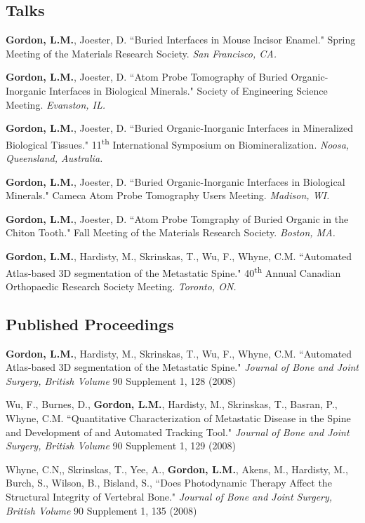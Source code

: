 \subsection*{Talks}
\textbf{Gordon, L.M.}, Joester, D. ``Buried Interfaces in Mouse Incisor Enamel." Spring Meeting of the Materials Research Society. \emph{San Francisco, CA.}

\begingroup\setlength{\parskip}{0.15cm}
\textbf{Gordon, L.M.}, Joester, D. ``Atom Probe Tomography of Buried Organic-Inorganic Interfaces in Biological Minerals." Society of Engineering Science Meeting. \emph{Evanston, IL.}

\textbf{Gordon, L.M.}, Joester, D. ``Buried Organic-Inorganic Interfaces in Mineralized Biological Tissues." 11\textsuperscript{th} International Symposium on Biomineralization. \emph{Noosa, Queensland, Australia.}

\textbf{Gordon, L.M.}, Joester, D. ``Buried Organic-Inorganic Interfaces in Biological Minerals." Cameca Atom Probe Tomography Users Meeting. \emph{Madison, WI.}

\textbf{Gordon, L.M.}, Joester, D. ``Atom Probe Tomgraphy of Buried Organic in the Chiton Tooth." Fall Meeting of the Materials Research Society. \emph{Boston, MA.}

\textbf{Gordon, L.M.}, Hardisty, M., Skrinskas, T., Wu, F., Whyne, C.M. ``Automated Atlas-based 3D segmentation of the Metastatic Spine." 40\textsuperscript{th} Annual Canadian Orthopaedic Research Society Meeting. \emph{Toronto, ON.}
\endgroup

\subsection*{Published Proceedings}
\textbf{Gordon, L.M.}, Hardisty, M., Skrinskas, T., Wu, F., Whyne, C.M. ``Automated Atlas-based 3D segmentation of the Metastatic Spine." \emph{Journal of Bone and Joint Surgery, British Volume} 90 Supplement 1, 128 (2008)

\begingroup\setlength{\parskip}{0.15cm}
Wu, F., Burnes, D., \textbf{Gordon, L.M.}, Hardisty, M., Skrinskas, T., Basran, P., Whyne, C.M. ``Quantitative Characterization of Metastatic Disease in the Spine and Development of and Automated Tracking Tool."  \emph{Journal of Bone and Joint Surgery, British Volume} 90 Supplement 1, 129 (2008)

Whyne, C.N,, Skrinskas, T., Yee, A., \textbf{Gordon, L.M.}, Akens, M., Hardisty, M., Burch, S., Wilson, B., Bisland, S., ``Does Photodynamic Therapy Affect the Structural Integrity of Vertebral Bone." \emph{Journal of Bone and Joint Surgery, British Volume} 90 Supplement 1, 135 (2008)

